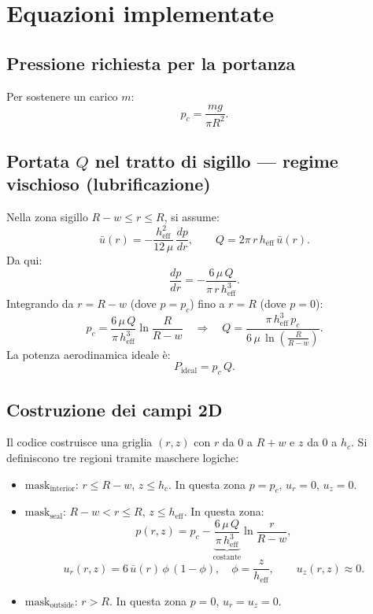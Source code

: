 \documentclass[11pt,a4paper]{article}
\begin{document}
\section{Equazioni implementate}

\subsection{Pressione richiesta per la portanza}
Per sostenere un carico \(m\):
\[
p_c = \frac{m g}{\pi R^2}.
\]

\subsection{Portata \(Q\) nel tratto di sigillo — regime vischioso (lubrificazione)}
Nella zona sigillo \(R - w \le r \le R\), si assume:
\[
\bar u(r) = -\frac{h_{\mathrm{eff}}^2}{12\,\mu}\,\frac{dp}{dr}, \qquad
Q = 2\pi\,r\,h_{\mathrm{eff}}\,\bar u(r).
\]
Da qui:
\[
\frac{dp}{dr} = -\frac{6\,\mu\,Q}{\pi\,r\,h_{\mathrm{eff}}^3}.
\]
Integrando da \(r = R-w\) (dove \(p = p_c\)) fino a \(r = R\) (dove \(p = 0\)):
\[
p_c = \frac{6\,\mu\,Q}{\pi\,h_{\mathrm{eff}}^3} \ln\!\frac{R}{R-w}
\quad\Longrightarrow\quad
Q = \frac{\pi\,h_{\mathrm{eff}}^3\,p_c}{6\,\mu\,\ln\!\left(\tfrac{R}{R-w}\right)}.
\]
La potenza aerodinamica ideale è:
\[
P_{\mathrm{ideal}} = p_c\,Q.
\]

\subsection{Costruzione dei campi 2D}
Il codice costruisce una griglia \((r,z)\) con \(r\) da \(0\) a \(R + w\) e \(z\) da \(0\) a \(h_c\).  
Si definiscono tre regioni tramite maschere logiche:
\begin{itemize}
  \item \(\text{mask}_{\mathrm{interior}}\): \(r \le R - w\), \(z \le h_c\). In questa zona \(p = p_c\), \(u_r = 0\), \(u_z = 0\).
  \item \(\text{mask}_{\mathrm{seal}}\): \(R - w < r \le R\), \(z \le h_{\mathrm{eff}}\). In questa zona:
  \[
  p(r,z) = p_c - \underbrace{\frac{6\,\mu\,Q}{\pi\,h_{\mathrm{eff}}^3}}_{\text{costante}} \ln\!\frac{r}{R-w},
  \]
  \[
  u_r(r,z) = 6\,\bar u(r)\,\phi\,(1 - \phi), \quad \phi = \frac{z}{h_{\mathrm{eff}}}, \qquad u_z(r,z) \approx 0.
  \]
  \item \(\text{mask}_{\mathrm{outside}}\): \(r > R\). In questa zona \(p = 0\), \(u_r = u_z = 0\).
\end{itemize}
\end{document}
